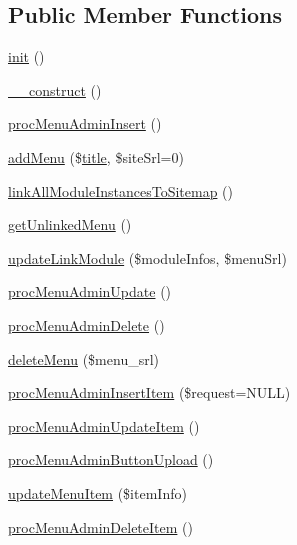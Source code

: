 \subsection*{Public Member Functions}
\begin{DoxyCompactItemize}
\item 
\hyperlink{classmenuAdminController_aa4ab2ac50988120d74af3f15a4beb144}{init} ()
\item 
\hyperlink{classmenuAdminController_a42288b1e9040f8ebc75f4fc92b1dcee3}{\+\_\+\+\_\+construct} ()
\item 
\hyperlink{classmenuAdminController_a3c022826d1ffe76b9d5557d3f126ff97}{proc\+Menu\+Admin\+Insert} ()
\item 
\hyperlink{classmenuAdminController_ae459bfa7455f77e1e98c6faf2875b877}{add\+Menu} (\$\hyperlink{ko_8install_8php_a5b072c5fd1d2228c6ba5cee13cd142e3}{title}, \$site\+Srl=0)
\item 
\hyperlink{classmenuAdminController_a49adc0f822800b87a3419fc4d0d48005}{link\+All\+Module\+Instances\+To\+Sitemap} ()
\item 
\hyperlink{classmenuAdminController_acebad90c1f5786c406f25e5afdbce1cb}{get\+Unlinked\+Menu} ()
\item 
\hyperlink{classmenuAdminController_a7e7dee4ee339e853f91c854f175c0915}{update\+Link\+Module} (\$module\+Infos, \$menu\+Srl)
\item 
\hyperlink{classmenuAdminController_a5069ab275f8531a71d6f14b08e4bc778}{proc\+Menu\+Admin\+Update} ()
\item 
\hyperlink{classmenuAdminController_a04aa66dfff4235f9b2749d1b33cd5c1c}{proc\+Menu\+Admin\+Delete} ()
\item 
\hyperlink{classmenuAdminController_a586b343461b2f2f5e66fd92dd5ed04df}{delete\+Menu} (\$menu\+\_\+srl)
\item 
\hyperlink{classmenuAdminController_a34064cdce4df5a16faf19ada16751afe}{proc\+Menu\+Admin\+Insert\+Item} (\$request=N\+U\+L\+L)
\item 
\hyperlink{classmenuAdminController_a1db2067a684b2a9f71c033f0ee7b185a}{proc\+Menu\+Admin\+Update\+Item} ()
\item 
\hyperlink{classmenuAdminController_a733cac454885536a8cd2d1b5c625109a}{proc\+Menu\+Admin\+Button\+Upload} ()
\item 
\hyperlink{classmenuAdminController_a2ea5f6b247860c3a92fdb78760b87c81}{update\+Menu\+Item} (\$item\+Info)
\item 
\hyperlink{classmenuAdminController_a95f3b583f04dcd805696f7fd33b13d9c}{proc\+Menu\+Admin\+Delete\+Item} ()

\end{DoxyCompactItemize}
